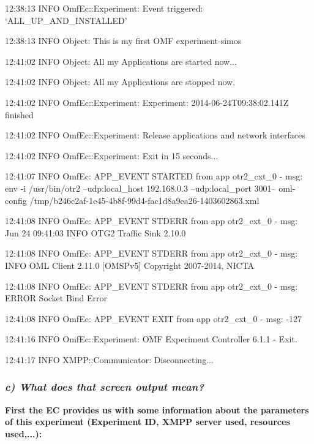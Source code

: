 \documentclass[letterpaper,10pt,english]{sphinxmanual}
\begin{document}
\begin{DUlineblock}{0em}
\item[] 12:38:13 INFO  OmfEc::Experiment: Event triggered: `ALL\_UP\_AND\_INSTALLED'
\item[] 12:38:13 INFO  Object: This is my first OMF experiment-simos
\item[] 12:41:02 INFO  Object: All my Applications are started now...
\item[] 12:41:02 INFO  Object: All my Applications are stopped now.
\item[] 12:41:02 INFO  OmfEc::Experiment: Experiment: 2014-06-24T09:38:02.141Z finished
\item[] 12:41:02 INFO  OmfEc::Experiment: Release applications and network interfaces
\item[] 12:41:02 INFO  OmfEc::Experiment: Exit in 15 seconds...
\item[] 12:41:07 INFO  OmfEc: APP\_EVENT STARTED from app otr2\_cxt\_0 - msg: env -i /usr/bin/otr2 --udp:local\_host 192.168.0.3 --udp:local\_port 3001-- \textbar{} oml-config /tmp/b246c2af-1e45-4b8f-99d4-fac1d8a9ea26-1403602863.xml
\item[] 12:41:08 INFO  OmfEc: APP\_EVENT STDERR from app otr2\_cxt\_0 - msg: Jun 24 09:41:03 INFO        OTG2 Traffic Sink 2.10.0
\item[] 12:41:08 INFO  OmfEc: APP\_EVENT STDERR from app otr2\_cxt\_0 - msg: INFO        OML Client 2.11.0 {[}OMSPv5{]} Copyright 2007-2014, NICTA
\item[] 12:41:08 INFO  OmfEc: APP\_EVENT STDERR from app otr2\_cxt\_0 - msg: ERROR       Socket Bind Error
\item[] 12:41:08 INFO  OmfEc: APP\_EVENT EXIT from app otr2\_cxt\_0 - msg: -127
\item[] 12:41:16 INFO  OmfEc::Experiment: OMF Experiment Controller 6.1.1 - Exit.
\item[] 12:41:17 INFO  XMPP::Communicator: Disconnecting...
\end{DUlineblock}


\subsubsection{\emph{c) What does that screen output mean?}}
\label{wireless_example:c-what-does-that-screen-output-mean}
\begin{DUlineblock}{0em}
\item[] \textbf{First the EC provides us with some information about the parameters of this experiment (Experiment ID, XMPP server used, resources         \textbar{} used,...):}
\end{DUlineblock}
\end{document}
